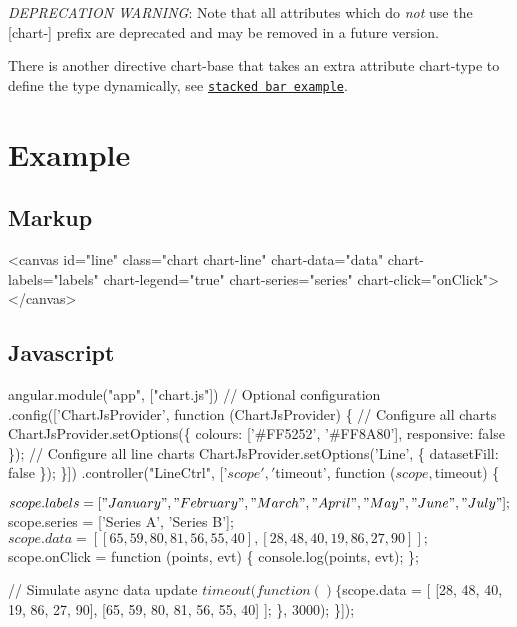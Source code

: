 {\itshape D\+E\+P\+R\+E\+C\+A\+T\+I\+ON W\+A\+R\+N\+I\+NG}\+: Note that all attributes which do {\itshape not} use the {\ttfamily \mbox{[}chart-\/\mbox{]}} prefix are deprecated and may be removed in a future version.

There is another directive {\ttfamily chart-\/base} that takes an extra attribute {\ttfamily chart-\/type} to define the type dynamically, see \href{http://jtblin.github.io/angular-chart.js/examples/stacked-bars.html}{\tt stacked bar example}.

\section*{Example}

\subsection*{Markup}


\begin{DoxyCode}
<canvas id="line" class="chart chart-line" chart-data="data" chart-labels="labels" 
    chart-legend="true" chart-series="series" chart-click="onClick"></canvas> 
\end{DoxyCode}


\subsection*{Javascript}


\begin{DoxyCode}
angular.module("app", ["chart.js"])
  // Optional configuration
  .config(['ChartJsProvider', function (ChartJsProvider) \{
    // Configure all charts
    ChartJsProvider.setOptions(\{
      colours: ['#FF5252', '#FF8A80'],
      responsive: false
    \});
    // Configure all line charts
    ChartJsProvider.setOptions('Line', \{
      datasetFill: false
    \});
  \}])
  .controller("LineCtrl", ['$scope', '$timeout', function ($scope, $timeout) \{

  $scope.labels = ["January", "February", "March", "April", "May", "June", "July"];
  $scope.series = ['Series A', 'Series B'];
  $scope.data = [
    [65, 59, 80, 81, 56, 55, 40],
    [28, 48, 40, 19, 86, 27, 90]
  ];
  $scope.onClick = function (points, evt) \{
    console.log(points, evt);
  \};

  // Simulate async data update
  $timeout(function () \{
    $scope.data = [
      [28, 48, 40, 19, 86, 27, 90],
      [65, 59, 80, 81, 56, 55, 40]
    ];
  \}, 3000);
\}]);
\end{DoxyCode}


